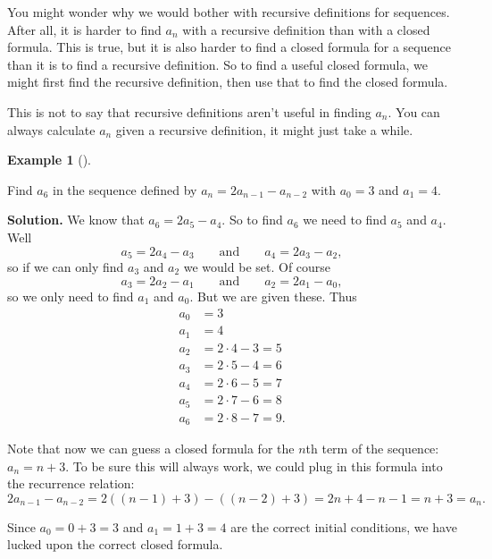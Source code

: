 \documentclass[10pt,]{book}
\theoremstyle{plain}
\theoremstyle{definition}
\newtheorem{example}[theorem]{Example}
\theoremstyle{definition}
\theoremstyle{definition}
\numberwithin{equation}{chapter}
\newcommand{\amp}{ & }
\begin{document}
    You might wonder why we would bother with recursive definitions for sequences. After all, it is harder to find \(a_n\) with a recursive definition than with a closed formula. This is true, but it is also harder to find a closed formula for a sequence than it is to find a recursive definition. So to find a useful closed formula, we might first find the recursive definition, then use that to find the closed formula.
\par

    This is not to say that recursive definitions aren't useful in finding \(a_n\). You can always calculate \(a_n\) given a recursive definition, it might just take a while.
\begin{example}[]\label{example-59}

        Find \(a_6\) in the sequence defined by \(a_n = 2a_{n-1} - a_{n-2}\) with \(a_0 = 3\) and \(a_1 = 4\).
\par\medskip\noindent%
\textbf{Solution.}\quad
        We know that \(a_6 = 2a_5 - a_4\). So to find \(a_6\) we need to find \(a_5\) and \(a_4\). Well
        \begin{equation*}
          a_5 = 2a_4 - a_3 \qquad \text{and} \qquad a_4 = 2a_3 - a_2,
        \end{equation*}
        so if we can only find \(a_3\) and \(a_2\) we would be set. Of course
        \begin{equation*}
          a_3 = 2a_2 - a_1 \qquad \text{and} \qquad a_2 = 2a_1 - a_0,
        \end{equation*}
        so we only need to find \(a_1\) and \(a_0\). But we are given these. Thus
        \begin{align*}
 a_0 \amp = 3\\
 a_1 \amp = 4\\
 a_2 \amp = 2\cdot 4 - 3 = 5\\
 a_3 \amp = 2\cdot 5 - 4 = 6\\
 a_4 \amp = 2\cdot 6 - 5 = 7\\
 a_5 \amp = 2\cdot 7 - 6 = 8\\
 a_6 \amp = 2\cdot 8 - 7 = 9.
\end{align*}
\par

        Note that now we can guess a closed formula for the \(n\)th term of the sequence: \(a_n = n+3\). To be sure this will always work, we could plug in this formula into the recurrence relation:
        \begin{equation*}
          2a_{n-1} - a_{n-2} = 2((n-1) + 3) - ((n-2) + 3) = 2n + 4 - n - 1 = n + 3 = a_n.
        \end{equation*}
\par

        Since \(a_0 = 0 + 3 = 3\) and \(a_1 = 1+3 = 4\) are the correct initial conditions, we have lucked upon the correct closed formula.
\end{example}
\par
\end{document}
